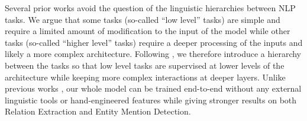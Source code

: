 \documentclass[letterpaper]{article}
\begin{document}
\begin{table}
    \caption{A few examples motivating our selection of tasks. \newline Abbreviations: CR: Coreference Resolution, RE: Relation Extraction, EMD: Entity Mention Detection, NER: Named Entity Recognition, X $\rightsquigarrow$ Y: X is more likely to be Y.}
    \label{tab:motivating_examples}
    \centering
\end{table}

Several prior works \cite{Yang2016,BingelS17} avoid the question of the linguistic hierarchies between NLP tasks. We argue that some tasks (so-called ``low level'' tasks) are simple and require a limited amount of modification to the input of the model while other tasks (so-called ``higher level'' tasks) require a deeper processing of the inputs and likely a more complex architecture. Following \cite{Hashimoto2017,Sogaard2016}, we therefore introduce a hierarchy between the tasks so that low level tasks are supervised at lower levels of the architecture while keeping more complex interactions at deeper layers.
Unlike previous works \cite{Li2014,Miwa2016}, our whole model can be trained end-to-end without any external linguistic tools or hand-engineered features while giving stronger results on both Relation Extraction and Entity Mention Detection.
\end{document}
